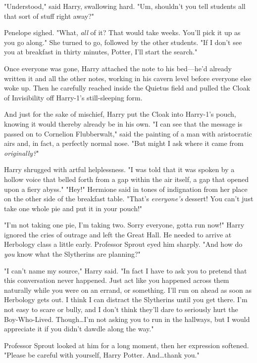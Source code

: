 "Understood," said Harry, swallowing hard. "Um, shouldn't you tell students all
that sort of stuff right away?"

Penelope sighed. "What, \emph{all} of it? That would take weeks. You'll pick it
up as you go along." She turned to go, followed by the other students. "If I
don't see you at breakfast in thirty minutes, Potter, I'll start the search."

Once everyone was gone, Harry attached the note to his bed—he'd already
written it and all the other notes, working in his cavern level before everyone
else woke up. Then he carefully reached inside the Quietus field and pulled the
Cloak of Invisibility off Harry-1's still-sleeping form.

And just for the sake of mischief, Harry put the Cloak into Harry-1's pouch,
knowing it would thereby already be in his own.
\later
"I can see that the message is passed on to Cornelion Flubberwalt," said the
painting of a man with aristocratic airs and, in fact, a perfectly normal nose.
"But might I ask where it came from \emph{originally?}"

Harry shrugged with artful helplessness. "I was told that it was spoken by a
hollow voice that belled forth from a gap within the air itself, a gap that
opened upon a fiery abyss."
\later
"Hey!" Hermione said in tones of indignation from her place on the other side
of the breakfast table. "That's \emph{everyone's} dessert! You can't just take
one whole pie and put it in your pouch!"

"I'm not taking one pie, I'm taking two. Sorry everyone, gotta run now!" Harry
ignored the cries of outrage and left the Great Hall. He needed to arrive at
Herbology class a little early.
\later
Professor Sprout eyed him sharply. "And how do \emph{you} know what the
Slytherins are planning?"

"I can't name my source," Harry said. "In fact I have to ask you to pretend
that this conversation never happened. Just act like you happened across them
naturally while you were on an errand, or something. I'll run on ahead as soon
as Herbology gets out. I think I can distract the Slytherins until you get
there. I'm not easy to scare or bully, and I don't think they'll dare to
seriously hurt the Boy-Who-Lived. Though…I'm not asking you to run in
the hallways, but I would appreciate it if you didn't dawdle along the way."

Professor Sprout looked at him for a long moment, then her expression softened.
"Please be careful with yourself, Harry Potter. And…thank you."

